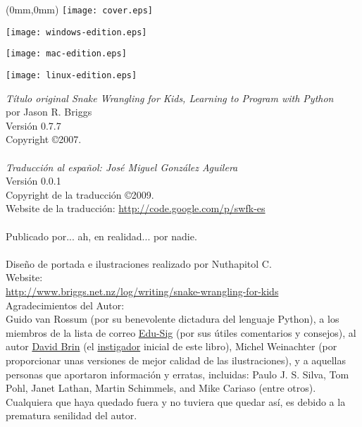 \pagestyle{empty}
\frontmatter
\begin{FRONTCOVER}
\begin{titlepage}
\begin{textblock*}{210mm}(0mm,0mm)
   \texttt{[image: cover.eps]}
\end{textblock*}
\begin{flushleft}
\begin{WINDOWS}
\texttt{[image: windows-edition.eps]} 
\end{WINDOWS}
\begin{MAC}
\texttt{[image: mac-edition.eps]} 
\end{MAC}
\begin{LINUX}
\texttt{[image: linux-edition.eps]} 
\end{LINUX}
\end{flushleft}
\end{titlepage}
\end{FRONTCOVER}

\noindent
\textsf{\emph{Título original Snake Wrangling for Kids, Learning to Program with Python}}\\
por Jason R. Briggs\\
Versión 0.7.7
\\
Copyright \copyright 2007.\\
\\
\textsf{\emph{Traducción al español: José Miguel González Aguilera}}\\
Versión 0.0.1\\
Copyright de la traducción \copyright 2009.\\
Website de la traducción: \href{http://code.google.com/p/swfk-es}{http://code.google.com/p/swfk-es}\\
\\
Publicado por... ah, en realidad... por nadie.\\
\\
Diseño de portada e ilustraciones realizado por Nuthapitol C.\\
\linebreak 
\noindent
Website:\\ \href{http://www.briggs.net.nz/log/writing/snake-wrangling-for-kids}{http://www.briggs.net.nz/log/writing/snake-wrangling-for-kids}\\ 

\noindent
Agradecimientos del Autor:\\
Guido van Rossum (por su benevolente dictadura del lenguaje Python), a los miembros de la lista de correo \href{http://www.python.org/community/sigs/current/edu-sig/}{Edu-Sig} (por sus útiles comentarios y consejos), al autor \href{http://www.davidbrin.com/}{David Brin} (el \href{http://www.salon.com/tech/feature/2006/09/14/basic/}{instigador} inicial de este libro), Michel Weinachter (por proporcionar unas versiones de mejor calidad de las ilustraciones), y a aquellas personas que aportaron información y erratas, incluidas: Paulo J. S. Silva, Tom Pohl, Janet Lathan, Martin Schimmels, and Mike Cariaso (entre otros).  Cualquiera que haya quedado fuera y no tuviera que quedar así, es debido a la prematura senilidad del autor.\\

